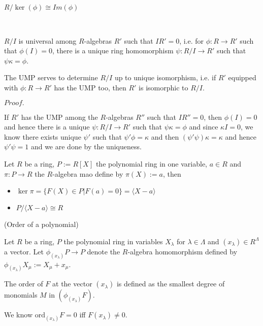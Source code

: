 \documentclass{article}
\newcommand{\Pf}[1]{$Proof.$\par}
\begin{document}
\begin{corollary}
    $R/\ker(\phi) \cong Im(\phi)$
\end{corollary}

\begin{proposition}\ \par
    $R/I$ is universal among $R$-algebras $R'$ such that $IR' = 0$, i.e. for $\phi:R\to R'$ such that $\phi(I) = 0$, there is a unique ring homomorphism $\psi:R/I \to R'$ such that $\psi \kappa = \phi$.
\end{proposition}

\begin{definition}
    The UMP serves to determine $R/I$ up to unique isomorphism, i.e. if $R'$ equipped with $\phi:R\to R'$ has the UMP too, then $R'$ is isomorphic to $R/I$.
\end{definition}
\Pf\par
    If $R'$ has the UMP among the $R$-algebras $R''$ such that $IR'' = 0$, then $\phi(I) = 0$ and hence there is a unique $\psi:R/I \to R'$ such that $\psi\kappa = \phi$ and since $\kappa I = 0$, we know there exists unique $\psi'$ such that $\psi'\phi = \kappa$ and then $(\psi'\psi)\kappa = \kappa$ and hence $\psi'\psi = 1$ and we are done by the uniqueness.

\begin{proposition}
    Let $R$ be a ring, $P:=R[X]$ the polynomial ring in one variable, $a\in R$ and $\pi:P\to R$ the $R$-algebra mao define by $\pi(X):=a$, then
    \begin{itemize}
        \item $\ker\pi = \{F(X)\in P|F(a) = 0\} = \langle X-a\rangle$
        \item $P/\langle X-a\rangle \cong R$
    \end{itemize}
\end{proposition}

\begin{definition}
    (Order of a polynomial)\par
    Let $R$ be a ring, $P$ the polynomial ring in variables $X_{\lambda}$ for $\lambda \in \Lambda$ and $(x_{\lambda}) \in R^{\Lambda}$ a vector. Let $\phi_{(x_{\lambda})}P\to P$ denote the $R$-algebra homomorphism defined by $\phi_{(x_{\lambda})}X_{\mu} := X_{\mu} + x_{\mu}$.\par
    The order of $F$ at the vector $(x_{\lambda})$ is defined as the smallest degree of monomials $M$ in $(\phi_{(x_{\lambda})}F)$.\par
    We know $\text{ord}_{(x_{\lambda})}F = 0$ iff $F(x_{\lambda}) \neq 0$.
\end{definition}
\end{document}
